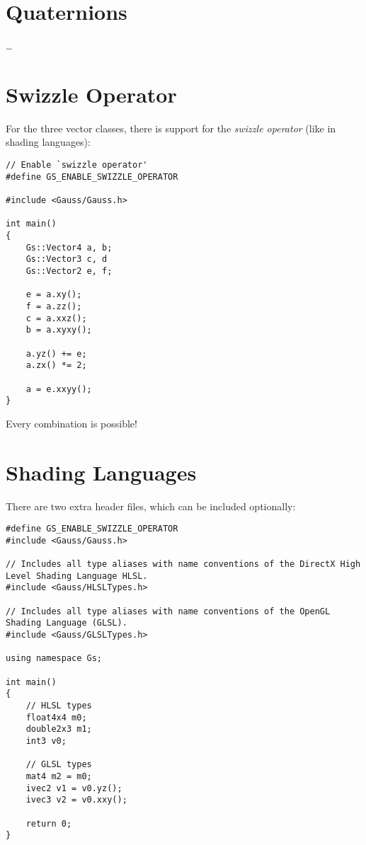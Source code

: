 \documentclass{article}
\begin{document}

\section*{Quaternions}

\dots



\section*{Swizzle Operator}

For the three vector classes, there is support for the \textit{swizzle operator} (like in shading languages):
\begin{lstlisting}
// Enable `swizzle operator'
#define GS_ENABLE_SWIZZLE_OPERATOR

#include <Gauss/Gauss.h>

int main()
{
	Gs::Vector4 a, b;
	Gs::Vector3 c, d
	Gs::Vector2 e, f;
	
	e = a.xy();
	f = a.zz();
	c = a.xxz();
	b = a.xyxy();
	
	a.yz() += e;
	a.zx() *= 2;
	
	a = e.xxyy();
}
\end{lstlisting}
Every combination is possible!



\section*{Shading Languages}

There are two extra header files, which can be included optionally:
\begin{lstlisting}
#define GS_ENABLE_SWIZZLE_OPERATOR
#include <Gauss/Gauss.h>

// Includes all type aliases with name conventions of the DirectX High Level Shading Language HLSL.
#include <Gauss/HLSLTypes.h>

// Includes all type aliases with name conventions of the OpenGL Shading Language (GLSL).
#include <Gauss/GLSLTypes.h>

using namespace Gs;

int main()
{
	// HLSL types
	float4x4 m0;
	double2x3 m1;
	int3 v0;
	
	// GLSL types
	mat4 m2 = m0;
	ivec2 v1 = v0.yz();
	ivec3 v2 = v0.xxy();
	
	return 0;
}
\end{lstlisting}
\end{document}
